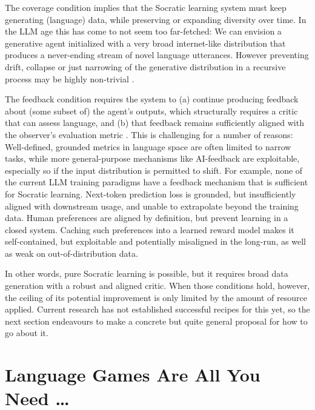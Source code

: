 \documentclass[dvipsnames]{article} %
\begin{document}
The coverage condition implies that the Socratic learning system must keep generating (language) data, while preserving or expanding diversity over time.
In the LLM age this has come to not seem too far-fetched: We can envision a generative agent initialized with a very broad internet-like distribution that produces a never-ending stream of novel language utterances.
However preventing drift, collapse or just narrowing of the generative distribution in a recursive process may be highly non-trivial \citep{lewis2017deal,shi2024continual}.

The feedback condition requires the system to (a) continue producing feedback about (some subset of) the agent's outputs, which structurally requires a critic that can assess language, and (b) that feedback remains sufficiently aligned with the observer's evaluation metric \citep{christiano2018supervising,bai2022constitutional}.
This is challenging for a number of reasons: Well-defined, grounded metrics in language space are often limited to narrow tasks, while more general-purpose mechanisms like AI-feedback are exploitable, especially so if the input distribution is permitted to shift.
%
For example, none of the current LLM training paradigms have a feedback mechanism that is sufficient for Socratic learning. Next-token prediction loss is grounded, but insufficiently aligned with downstream usage, and unable to extrapolate beyond the training data. Human preferences are aligned by definition, but prevent learning in a closed system. Caching such preferences into a learned reward model makes it self-contained, but exploitable and potentially misaligned in the long-run, as well as weak on out-of-distribution data.

In other words, pure Socratic learning is possible, but it requires broad data generation with a robust and aligned critic. When those conditions hold, however, the ceiling of its potential improvement is only limited by the amount of resource applied.
%
Current research has not established successful recipes for this yet, so the next section endeavours to make a concrete but quite general proposal for how to go about it.



\section{Language Games Are All You Need \ldots}
\end{document}
